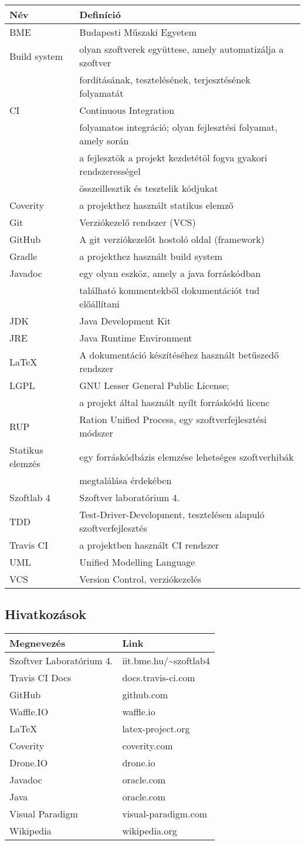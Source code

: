 \begin{tabularx}{\textwidth}{| l | l |}
\hline
\textbf{Név} & \textbf{Definíció} \tabularnewline 
\hline\hline
\endhead
BME & Budapesti Műszaki Egyetem \tabularnewline \hline
Build system & olyan szoftverek együttese, amely automatizálja a szoftver \\
             & fordításának, tesztelésének, terjesztésének folyamatát \tabularnewline \hline
CI & Continuous Integration \\ 
   & folyamatos integráció; olyan fejlesztési folyamat, amely során \\
   & a fejlesztök a projekt kezdetétöl fogva gyakori rendszerességel \\
   & összeillesztik és tesztelik kódjukat\tabularnewline \hline
Coverity & a projekthez használt statikus elemző \tabularnewline \hline
Git & Verziókezelő rendszer (VCS) \tabularnewline \hline
GitHub & A git verziókezelőt hostoló oldal (framework) \tabularnewline \hline
Gradle & a projekthez használt build system \tabularnewline \hline
Javadoc & egy olyan eszköz, amely a java forráskódban \\ 
        & található kommentekből dokumentációt tud előállítani \tabularnewline \hline
JDK & Java Development Kit \tabularnewline \hline
JRE & Java Runtime Environment \tabularnewline \hline
LaTeX & A dokumentáció készítéséhez használt betűszedő rendszer \tabularnewline \hline
LGPL & GNU Lesser General Public License; \\ 
     & a projekt által használt nyílt forráskódú licenc \tabularnewline \hline
RUP & Ration Unified Process, egy szoftverfejlesztési módszer \tabularnewline \hline
Statikus elemzés & egy forráskódbázis elemzése lehetséges szoftverhibák \\
                  & megtalálása érdekében \tabularnewline \hline
Szoftlab 4 & Szoftver laboratórium 4. \tabularnewline \hline
TDD & Test-Driver-Development, tesztelésen alapuló szoftverfejlesztés \tabularnewline \hline
Travis CI & a projektben használt CI rendszer \tabularnewline \hline
UML & Unified Modelling Language \tabularnewline \hline
VCS & Version Control, verziókezelés \tabularnewline \hline
\end{tabularx}


\subsection{Hivatkozások}
\begin{tabularx}{\textwidth}{| l | l |}
\hline
\textbf{Megnevezés} & \textbf{Link} \tabularnewline 
\hline\hline
\endhead
Szoftver Laboratórium 4. & iit.bme.hu/\textasciitilde szoftlab4 \tabularnewline \hline
Travis CI Docs & docs.travis-ci.com \tabularnewline \hline
GitHub & github.com \tabularnewline \hline
Waffle.IO & waffle.io  \tabularnewline \hline
LaTeX & latex-project.org \tabularnewline \hline
Coverity & coverity.com \tabularnewline \hline
Drone.IO & drone.io \tabularnewline \hline
Javadoc & oracle.com \tabularnewline \hline
Java & oracle.com \tabularnewline \hline
Visual Paradigm & visual-paradigm.com \tabularnewline \hline
Wikipedia & wikipedia.org \tabularnewline \hline
\end{tabularx}


